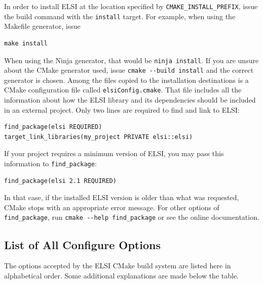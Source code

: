 \documentclass{report}
\begin{document}
In order to install ELSI at the location specified by \verb+CMAKE_INSTALL_PREFIX+, issue the build command with the \verb+install+ target. For example, when using the Makefile generator, issue
\begin{verbatim}
make install
\end{verbatim}
When using the Ninja generator, that would be \verb+ninja install+. If you are unsure about the CMake generator used, issue \verb+cmake --build install+ and the correct generator is chosen. Among the files copied to the installation destinations is a CMake configuration file called \texttt{elsiConfig.cmake}. That file includes all the information about how the ELSI library and its dependencies should be included in an external project. Only two lines are required to find and link to ELSI:
\begin{verbatim}
find_package(elsi REQUIRED)
target_link_libraries(my_project PRIVATE elsi::elsi)
\end{verbatim}
If your project requires a minimum version of ELSI, you may pass this information to \verb+find_package+:
\begin{verbatim}
find_package(elsi 2.1 REQUIRED)
\end{verbatim}
In that case, if the installed ELSI version is older than what was requested, CMake stops with an appropriate error message. For other options of \verb+find_package+, run \verb+cmake --help find_package+ or see the online documentation.

\subsection{List of All Configure Options}
\label{subsec:config_keywords}
The options accepted by the ELSI CMake build system are listed here in alphabetical order.  Some additional explanations are made below the table.\\
\end{document}
